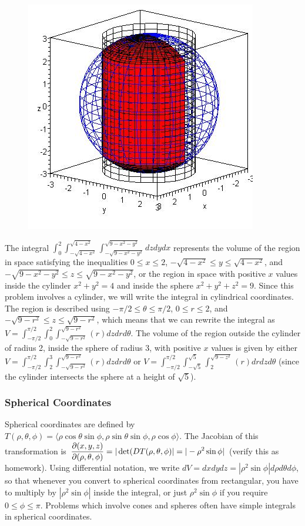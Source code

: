 \begin{figure}
\newcommand{\myheight}{.8in}
\includegraphics[height=\myheight]{10-SurfaceTripleIntegrals/support/cylindrical-2}
\end{figure}
The integral
$\int_0^2\int_{-\sqrt{4-x^2}}^{\sqrt{4-x^2}}\int_{-\sqrt{9-x^2-y^2}}^{\sqrt{9-x^2-y^2}}dzdydx$
represents the volume of the region in space satisfying the
inequalities $0\leq x\leq 2$, ${-\sqrt{4-x^2}}\leq y\leq {\sqrt{4-x^2}}$, and
${-\sqrt{9-x^2-y^2}}\leq z\leq{\sqrt{9-x^2-y^2}}$, or the region in space
with positive $x$ values inside the cylinder $x^2+y^2=4$ and inside
the sphere $x^2+y^2+z^2=9$. Since this problem involves a cylinder, we
will write the integral in cylindrical coordinates.  The region is
described using $-\pi/2\leq \theta\leq \pi/2$, $0\leq r\leq 2$, and $-\sqrt{9-r^2}\leq z\leq 
\sqrt{9-r^2}$, which means that we can rewrite the integral as $V=
\int_{-\pi/2}^{\pi/2}\int_0^2\int_{-\sqrt{9-r^2}}^{\sqrt{9-r^2}}(r)dzdrd\theta $. The
volume of the region outside the cylinder of radius 2, inside the
sphere of radius 3, with positive $x$ values is given by either $V=
\int_{-\pi/2}^{\pi/2}\int_2^3\int_{-\sqrt{9-r^2}}^{\sqrt{9-r^2}}(r)dzdrd\theta $ or $V=
\int_{-\pi/2}^{\pi/2}\int_{-\sqrt 5}^{\sqrt{5}}\int_{2}^{\sqrt{9-z^2}}(r)drdzd\theta $
(since the cylinder intersects the sphere at a height of $\sqrt 5$).



\subsubsection{Spherical Coordinates}
Spherical coordinates are defined by $T(\rho,\theta,\phi) = \langle\rho\cos\theta\sin\phi,
\rho\sin\theta\sin\phi,\rho\cos\phi\rangle$.  The Jacobian of this transformation is $\displaystyle
\frac{\partial(x,y,z)}{\partial(\rho,\theta,\phi)} = |\det(DT(\rho,\theta,\phi)| = |-\rho^2\sin\phi|$ (verify
this as homework). Using differential notation, we write
$dV=dxdydz=|\rho^2\sin\phi|d\rho d\theta d\phi$, so that whenever you convert to
spherical coordinates from rectangular, you have to multiply by
$|\rho^2\sin\phi|$ inside the integral, or just $\rho^2\sin\phi$ if you require
{$0\leq \phi\leq \pi$}. Problems which involve cones and spheres often have
simple integrals in spherical coordinates.

